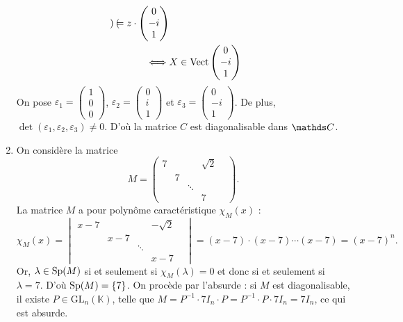 \begin{exo}
\begin{enumerate}
\begin{align*}
\begin{pmatrix}
				\end{pmatrix} = z \cdot \begin{pmatrix}
					0\\-i\\1
				\end{pmatrix}\\
				\iff& X \in \operatorname{Vect}\begin{pmatrix}
					0\\-i\\1
				\end{pmatrix}
			\end{align*}
			On pose $\varepsilon_1 = \left( \substack{1\\0\\0} \right)$, $\varepsilon_2 = \left( \substack{0\\i\\1} \right)$\/ et $\varepsilon_3 = \left( \substack{0\\-i\\1} \right)$. De plus, $\det(\varepsilon_1, \varepsilon_2,\varepsilon_3) \neq 0$. D'où la matrice $C$\/ est diagonalisable dans $\C$.
		\item On considère la matrice \[
			M = \begin{pmatrix}
				7&&&\sqrt{2}\\
				&7&&&\\
				&&\ddots&\\
				&&&7
			\end{pmatrix}
		.\]
		La matrice $M$\/ a pour polynôme caractéristique $\chi_M(x)$\/ : \[
			\chi_M(x) =
			\begin{vmatrix}
				x-7&&&-\sqrt{2}\\
				&x-7&&&\\
				&&\ddots&\\
				&&&x-7
			\end{vmatrix} = (x-7)\cdot (x-7)\cdots (x-7) = (x-7)^n
		.\]
		Or, $\lambda \in \operatorname{Sp}(M)$\/ si et seulement si $\chi_M(\lambda) = 0$\/ et donc si et seulement si $\lambda = 7$. D'où $\operatorname{Sp}(M) = \{7\}$.
		On procède par l'absurde : si $M$\/ est diagonalisable, il existe $P \in \mathrm{GL}_n(\mathds{K})$, telle que $M = P^{-1} \cdot 7I_n \cdot P = P^{-1}\cdot P \cdot 7I_n = 7I_n$, ce qui est absurde.
	\end{enumerate}
\end{exo}
